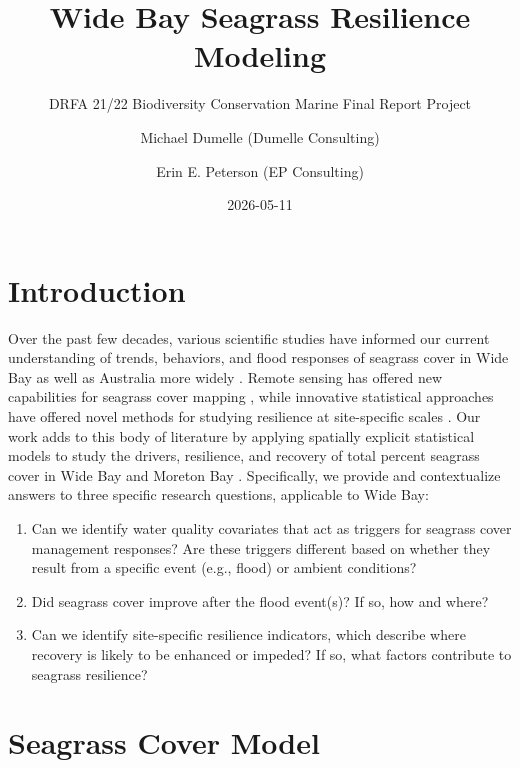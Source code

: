 \documentclass[
  letterpaper,
  DIV=11,
  numbers=noendperiod]{scrartcl}
\title{Wide Bay Seagrass Resilience Modeling}
\subtitle{DRFA 21/22 Biodiversity Conservation Marine Final Report
Project}
\author{Michael Dumelle (Dumelle Consulting) \and Erin E. Peterson (EP
Consulting)}
\date{2026-05-11}
\providecommand{\tightlist}{%
  \setlength{\itemsep}{0pt}\setlength{\parskip}{0pt}}
\renewcommand*\contentsname{Table of contents}
\newcommand\contentsname{Table of contents}
\begin{document}
\maketitle

\renewcommand*\contentsname{Table of contents}
{
\hypersetup{linkcolor=}
\setcounter{tocdepth}{3}
\tableofcontents
}

\section{Introduction}\label{introduction}

Over the past few decades, various scientific studies have informed our
current understanding of trends, behaviors, and flood responses of
seagrass cover in Wide Bay
\citep{preen1995flood, mcmahon2005herbicide, york2022post} as well as
Australia more widely
\citep{kilminster2015unravelling, gilby2018seagrass, o2018seagrass}.
Remote sensing has offered new capabilities for seagrass cover mapping
\citep{roelfsema2009integrated}, while innovative statistical approaches
have offered novel methods for studying resilience at site-specific
scales \citep{gilby2023drivers}. Our work adds to this body of
literature by applying spatially explicit statistical models
\citep{cressie1993statistics} to study the drivers, resilience, and
recovery of total percent seagrass cover in Wide Bay and Moreton Bay
\citep{dumelle2026moreton}. Specifically, we provide and contextualize
answers to three specific research questions, applicable to Wide Bay:

\begin{enumerate}
\def\labelenumi{\arabic{enumi}.}
\tightlist
\item
  Can we identify water quality covariates that act as triggers for
  seagrass cover management responses? Are these triggers different
  based on whether they result from a specific event (e.g., flood) or
  ambient conditions?
\item
  Did seagrass cover improve after the flood event(s)? If so, how and
  where?
\item
  Can we identify site-specific resilience indicators, which describe
  where recovery is likely to be enhanced or impeded? If so, what
  factors contribute to seagrass resilience?
\end{enumerate}

\section{Seagrass Cover Model}\label{seagrass-cover-model}
\end{document}
